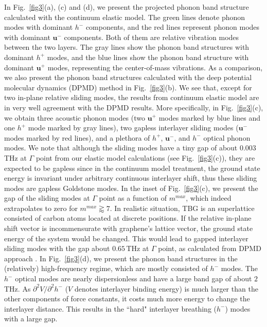 \documentclass[aps,prx,10pt,twocolumn,superscriptaddress]{revtex4}
\begin{document}
In Fig.~\ref{fig3}(a), (c) and (d), we present the projected phonon band structure calculated with the continuum elastic model. The green lines denote phonon modes with dominant $h^{-}$  components, and the red lines represent phonon modes with dominant $\textbf{u}^{-}$  components. Both of them are relative vibration modes between the two layers. The gray lines show the phonon band structures with dominant $h^{+}$ modes, and the blue lines show the phonon band structure with dominant $\textbf{u}^{+}$ modes, representing the center-of-mass vibrations. As a comparison, we also present the phonon band structures calculated with the deep potential molecular dynamics (DPMD) method \cite{liu-phonon-nano22} in Fig.~\ref{fig3}(b). We see that, except for two in-plane relative sliding modes, the results from continuum elastic model are in very well agreement with the DPMD results. More specifically, in Fig.~\ref{fig3}(c), we obtain three acoustic phonon modes (two $\mathbf{u}^{+}$ modes marked by blue lines  and one $h^{+}$ mode marked by gray lines), two gapless interlayer sliding modes ($\mathbf{u}^{-}$ modes marked by red lines), and a plethora of $h^{+}$, $\mathbf{u}^{-}$, and $h^{-}$ optical phonon modes. We note that although the sliding modes have a tiny gap of about $0.003\,$THz at $\Gamma$ point from our elastic model calculations (see Fig.~\ref{fig3}(c)), they are expected to be gapless since in the continuum model treatment, the ground state energy is invariant under arbitrary continuous interlayer shift, thus these sliding modes are gapless Goldstone modes.  In the inset of Fig.~\ref{fig3}(c), we present the gap of the sliding modes at $\Gamma$ point as a function of $m^{max}$, which indeed extrapolates to zero for $m^{max}\gtrapprox 7$. 
In realistic situation, TBG is an superlattice consisted of carbon atoms located at discrete positions. If the relative in-plane shift vector is incommensurate with graphene's lattice vector, the ground state energy of the system would be changed. This would  lead to gapped interlayer sliding modes with the gap about $0.65\,$THz at $\Gamma$ point, as calculated from DPMD approach \cite{liu-phonon-nano22}. In Fig.~\ref{fig3}(d), we present the phonon band structures in the (relatively) high-frequency regime, which are mostly consisted of $h^{-}$ modes. The $h^{-}$ optical modes are nearly dispersionless and have a large band gap of about $2\,$THz. As $\partial^2 V/\partial^2 h^{-}$ ($V$ denotes interlayer binding energy) %
is much larger than the other components of force constants, it costs much more energy to change the interlayer distance. This results in  the ``hard" interlayer breathing ($h^{-}$) modes with a large gap. 
\end{document}
